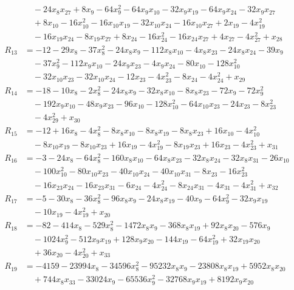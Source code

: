 \begin{align*}
&\quad -24x_{8}x_{27}+8x_{9}-64x_{9}^{2}-64x_{9}x_{10}-32x_{9}x_{19}-64x_{9}x_{24}-32x_{9}x_{27}\\
&\quad +8x_{10}-16x_{10}^{2}-16x_{10}x_{19}-32x_{10}x_{24}-16x_{10}x_{27}+2x_{19}-4x_{19}^{2}\\
&\quad -16x_{19}x_{24}-8x_{19}x_{27}+8x_{24}-16x_{24}^{2}-16x_{24}x_{27}+4x_{27}-4x_{27}^{2}+x_{28}\\[2pt]
R_{13}&=-12-29x_{8}-37x_{8}^{2}-24x_{8}x_{9}-112x_{8}x_{10}-4x_{8}x_{23}-24x_{8}x_{24}-39x_{9}\\
&\quad -37x_{9}^{2}-112x_{9}x_{10}-24x_{9}x_{23}-4x_{9}x_{24}-80x_{10}-128x_{10}^{2}\\
&\quad -32x_{10}x_{23}-32x_{10}x_{24}-12x_{23}-4x_{23}^{2}-8x_{24}-4x_{24}^{2}+x_{29}\\[2pt]
R_{14}&=-18-10x_{8}-2x_{8}^{2}-24x_{8}x_{9}-32x_{8}x_{10}-8x_{8}x_{23}-72x_{9}-72x_{9}^{2}\\
&\quad -192x_{9}x_{10}-48x_{9}x_{23}-96x_{10}-128x_{10}^{2}-64x_{10}x_{23}-24x_{23}-8x_{23}^{2}\\
&\quad -4x_{29}^{2}+x_{30}\\[2pt]
R_{15}&=-12+16x_{8}-4x_{8}^{2}-8x_{8}x_{10}-8x_{8}x_{19}-8x_{8}x_{23}+16x_{10}-4x_{10}^{2}\\
&\quad -8x_{10}x_{19}-8x_{10}x_{23}+16x_{19}-4x_{19}^{2}-8x_{19}x_{23}+16x_{23}-4x_{23}^{2}+x_{31}\\[2pt]
R_{16}&=-3-24x_{8}-64x_{8}^{2}-160x_{8}x_{10}-64x_{8}x_{23}-32x_{8}x_{24}-32x_{8}x_{31}-26x_{10}\\
&\quad -100x_{10}^{2}-80x_{10}x_{23}-40x_{10}x_{24}-40x_{10}x_{31}-8x_{23}-16x_{23}^{2}\\
&\quad -16x_{23}x_{24}-16x_{23}x_{31}-6x_{24}-4x_{24}^{2}-8x_{24}x_{31}-4x_{31}-4x_{31}^{2}+x_{32}\\[2pt]
R_{17}&=-5-30x_{8}-36x_{8}^{2}-96x_{8}x_{9}-24x_{8}x_{19}-40x_{9}-64x_{9}^{2}-32x_{9}x_{19}\\
&\quad -10x_{19}-4x_{19}^{2}+x_{20}\\[2pt]
R_{18}&=-82-414x_{8}-529x_{8}^{2}-1472x_{8}x_{9}-368x_{8}x_{19}+92x_{8}x_{20}-576x_{9}\\
&\quad -1024x_{9}^{2}-512x_{9}x_{19}+128x_{9}x_{20}-144x_{19}-64x_{19}^{2}+32x_{19}x_{20}\\
&\quad +36x_{20}-4x_{20}^{2}+x_{33}\\[2pt]
R_{19}&=-4159-23994x_{8}-34596x_{8}^{2}-95232x_{8}x_{9}-23808x_{8}x_{19}+5952x_{8}x_{20}\\
&\quad +744x_{8}x_{33}-33024x_{9}-65536x_{9}^{2}-32768x_{9}x_{19}+8192x_{9}x_{20}\\

\end{align*}
